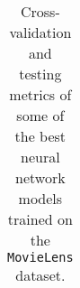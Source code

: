 \begin{table}
\begin{tabular}{lcclccccc}
           

\bottomrule
\end{tabular}
\caption{Cross-validation and testing metrics of some of the best neural network models trained on the \texttt{MovieLens} dataset. }
\label{tab:results.nn}
\end{table}
